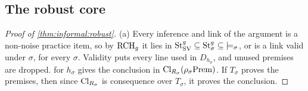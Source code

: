 \subsection{The robust core}\label{app:informal:robust}

\begin{proof}[Proof of \cref{thm:informal:robust}]
(a) Every inference and link of the argument is a non-noise practice item, so by $\mathrm{RCH}_g$ it lies in $\mathrm{St}^{g}_{\mathrm{SV}}\subseteq\mathrm{St}^{g}_{\sigma}\subseteq{\models_\sigma}$, or is a link valid under $\sigma$, for every $\sigma$. Validity puts every line used in $D_{h_\sigma}$, and unused premises are dropped.  for $h_\sigma$ gives the conclusion in $\mathrm{Cl}_{R_\sigma}(\rho_\sigma\mathrm{Prem})$. If $T_\sigma$ proves the premises, then since $\mathrm{Cl}_{R_\sigma}$ is consequence over $T_\sigma$, it proves the conclusion.


\end{proof}
